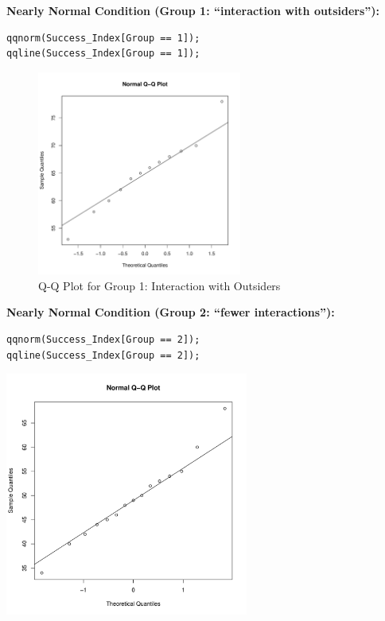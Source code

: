 \begin{example}
\vspace{0.5em}
\noindent\textbf{Nearly Normal Condition (Group 1: “interaction with outsiders”):}
\begin{tcolorbox}[colback=gray!10, colframe=black!45, arc=2mm,
  before skip=4pt, after skip=4pt]
\begin{verbatim}
qqnorm(Success_Index[Group == 1]);
qqline(Success_Index[Group == 1]);
\end{verbatim}
\end{tcolorbox}
\begin{figure}[H]
\centering
\includegraphics[width=0.6\textwidth]{section14.1/images/qqplot_group1.pdf}
\caption{Q-Q Plot for Group 1: Interaction with Outsiders}
\label{fig:qqplot-group1}
\end{figure}
\vspace{0.5em}
\noindent\textbf{Nearly Normal Condition (Group 2: “fewer interactions”):}
\begin{tcolorbox}[colback=gray!10, colframe=black!45, arc=2mm,
  before skip=4pt, after skip=4pt]
\begin{verbatim}
qqnorm(Success_Index[Group == 2]);
qqline(Success_Index[Group == 2]);
\end{verbatim}
\end{tcolorbox}
\noindent
\begin{minipage}{\textwidth}
\centering
\includegraphics[width=0.6\textwidth]{section14.1/images/qqplot_group2.pdf}
\vspace{-0.5em}


\end{minipage}
\end{example}
